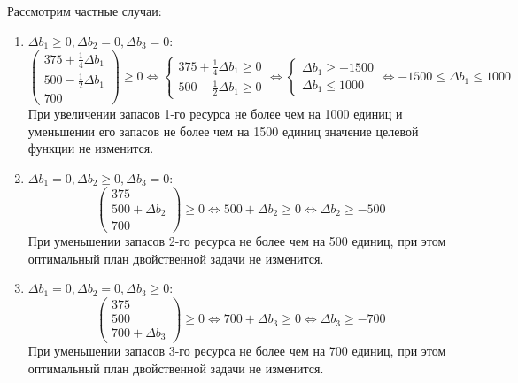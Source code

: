 Рассмотрим частные случаи:
\begin{enumerate}
    \item $\Delta b_1 \geq 0, \Delta b_2 = 0, \Delta b_3 = 0$:
          \[
              \begin{pmatrix}
                  375 + \frac{1}{4} \Delta b_1 \\
                  500 - \frac{1}{2} \Delta b_1 \\
                  700
              \end{pmatrix} \geq 0 \Leftrightarrow \begin{cases}
                  375 + \frac{1}{4} \Delta b_1 \geq 0 \\
                  500 - \frac{1}{2} \Delta b_1 \geq 0
              \end{cases} \Leftrightarrow \begin{cases}
                  \Delta b_1 \geq -1500 \\
                  \Delta b_1 \leq 1000
              \end{cases} \Leftrightarrow -1500 \leq \Delta b_1 \leq 1000
          \]
          При увеличении запасов 1-го ресурса не более чем на 1000 единиц и уменьшении его запасов не более чем на 1500 единиц значение целевой функции не изменится.
    \item $\Delta b_1 = 0, \Delta b_2 \geq 0, \Delta b_3 = 0$:
          \[
              \begin{pmatrix}
                  375              \\
                  500 + \Delta b_2 \\
                  700
              \end{pmatrix} \geq 0
              \Leftrightarrow 500 + \Delta b_2 \geq 0 \Leftrightarrow \Delta b_2 \geq -500
          \]
          При уменьшении запасов 2-го ресурса не более чем на 500 единиц, при этом оптимальный план двойственной задачи не изменится.
    \item $\Delta b_1 = 0, \Delta b_2 = 0, \Delta b_3 \geq 0$:
          \[
              \begin{pmatrix}
                  375 \\
                  500 \\
                  700 + \Delta b_3
              \end{pmatrix} \geq 0
              \Leftrightarrow 700 + \Delta b_3 \geq 0 \Leftrightarrow \Delta b_3 \geq -700
          \]
          При уменьшении запасов 3-го ресурса не более чем на 700 единиц, при этом оптимальный план двойственной задачи не изменится.
\end{enumerate}

